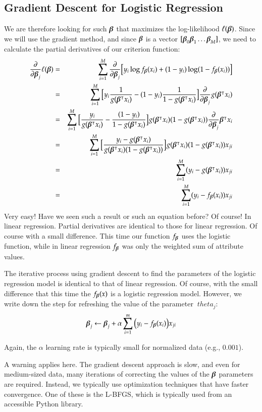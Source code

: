 \begin{refsection}
\section{Gradient Descent for Logistic Regression}
We are therefore looking for such $\boldsymbol{\beta}$ that maximizes the log-likelihood $\ell(\boldsymbol{\beta})$. Since we will use the gradient method, and since $\boldsymbol{\beta}$ is a vector $[\boldsymbol{\beta}_0  \boldsymbol{\beta}_1 \ldots \boldsymbol{\beta}_M] $, we need to calculate the partial derivatives of our criterion function:
\begin{eqnarray}
  \frac{\partial}{\partial\boldsymbol{\beta}_j}\ell(\boldsymbol{\beta})
  & = & \sum_{i=1}^M \frac{\partial}{\partial\boldsymbol{\beta}_j} \big[y_i\log f_{\boldsymbol{\beta}}(x_i)+(1-y_i)\log (1-f_{\boldsymbol{\beta}}(x_i)) \big] \nonumber \\
  & = & \sum_{i=1}^M \big[y_i\frac{1}{g(\boldsymbol{\beta}^\intercal x_i)}-(1-y_i)\frac{1}{1-g(\boldsymbol{\beta}^\intercal x_i)} \big]\frac{\partial}{\partial\boldsymbol{\beta}_j}g(\boldsymbol{\beta}^\intercal x_i) \nonumber\\
  & = & \sum_{i=1}^M \big[\frac{y_i}{g(\boldsymbol{\beta}^\intercal x_i)}-\frac{(1-y_i)}{1-g(\boldsymbol{\beta}^\intercal x_i)} \big]g(\boldsymbol{\beta}^\intercal x_i)(1-g(\boldsymbol{\beta}^\intercal x_i))
  \frac{\partial}{\partial\boldsymbol{\beta}_j}\boldsymbol{\beta}^\intercal x_i\nonumber\\
  & = & \sum_{i=1}^M \big[\frac{y_i - g(\boldsymbol{\beta}^\intercal x_i)} {g(\boldsymbol{\beta}^\intercal x_i)(1-g(\boldsymbol{\beta}^\intercal x_i))} \big]g(\boldsymbol{\beta}^\intercal x_i)(1-g(\boldsymbol{\beta}^\intercal x_i)) x_{ji}\nonumber\\
  & = & \sum_{i=1}^M (y_i-g(\boldsymbol{\beta}^\intercal x_i))x_{ji}\nonumber\\
  & = & \sum_{i=1}^M (y_i-f_{\boldsymbol{\beta}}(x_i))x_{ji}
  \label{eq:logreg-grad}
\end{eqnarray}
Very easy! Have we seen such a result or such an equation before? Of course! In linear regression. Partial derivatives are identical to those for linear regression. Of course with a small difference. This time our function $f_{\boldsymbol{\beta}}$ uses the logistic function, while in linear regression $f_{\boldsymbol{\beta}}$ was only the weighted sum of attribute values.

The iterative process using gradient descent to find the parameters of the logistic regression model is identical to that of linear regression. Of course, with the small difference that this time the $ f_{\boldsymbol{\beta}}(x)$ is a logistic regression model. However, we write down the step for refreshing the value of the parameter $ \ theta_j $:
\begin{equation}
  \boldsymbol{\beta}_j\leftarrow\boldsymbol{\beta}_j+\alpha\sum_{i=1}^{m}\big(y_i-f_{\boldsymbol{\beta}}(x_i)\big) x_{ji}
\end{equation}

Again, the $\alpha$ learning rate is typically small for normalized data (e.g., $0.001$).

A warning applies here. The gradient descent approach is slow, and even for medium-sized data, many iterations of correcting the values of the $\boldsymbol{\beta}$ parameters are required. Instead, we typically use optimization techniques that have faster convergence. One of these is the L-BFGS, which is typically used from an accessible Python library.

\printbibliography[heading=subbibliography]
\end{refsection}
